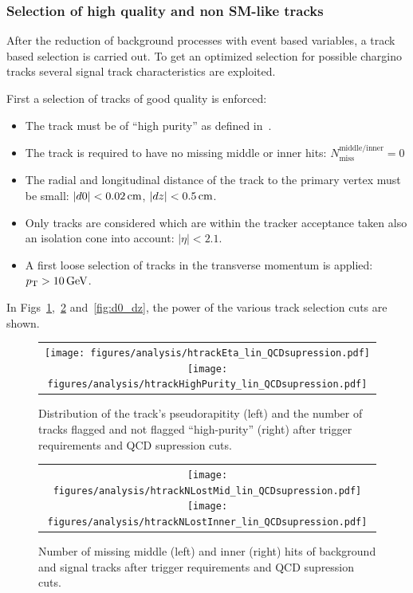 \subsubsection*{Selection of high quality and non SM-like tracks}
After the reduction of background processes with event based variables, a track based selection is carried out.
To get an optimized selection for possible chargino tracks several signal track characteristics are exploited.

First a selection of tracks of good quality is enforced:
\begin{itemize}
\renewcommand{\labelitemi}{\footnotesize{\ding{118}}}
\item The track must be of ``high purity'' as defined in~\cite{bib:CMS:Tracking_2010}.
\item The track is required to have no missing middle or inner hits: $N_{\text{miss}}^{\text{middle/inner}}=0$
\item The radial and longitudinal  distance of the track to the primary vertex must be small: \mbox{$|d0|<0.02\,\text{cm}$}, \mbox{$|dz|<0.5\,\text{cm}$}.
\item Only tracks are considered which are within the tracker acceptance taken also an isolation cone into account: $|\eta|<2.1$.
\item A first loose selection of tracks in the transverse momentum is applied: \mbox{$p_{\text{T}}>10\,\text{Ge}\kern-0.06667em\text{V}$}.
\end{itemize}
In Figs~\ref{fig:Eta_HighPurity},~\ref{fig:LostHits} and~\ref{fig:d0_dz}, the power of the various track selection cuts are shown.\\
\begin{figure}[!t]
  \centering 
  \begin{tabular}{c}
    \texttt{[image: figures/analysis/htrackEta\_lin\_QCDsupression.pdf]}
    \texttt{[image: figures/analysis/htrackHighPurity\_lin\_QCDsupression.pdf]}
  \end{tabular}
  \caption{Distribution of the track's pseudorapitity (left) and the number of tracks flagged and not flagged ``high-purity'' (right) after trigger requirements and QCD supression cuts.}
  \label{fig:Eta_HighPurity}
\end{figure}
\begin{figure}[!t]
  \centering 
  \begin{tabular}{c}
    \texttt{[image: figures/analysis/htrackNLostMid\_lin\_QCDsupression.pdf]}
    \texttt{[image: figures/analysis/htrackNLostInner\_lin\_QCDsupression.pdf]}
  \end{tabular}
  \caption{Number of missing middle (left) and inner (right) hits of background and signal tracks after trigger requirements and QCD supression cuts.}
  \label{fig:LostHits}
\end{figure}
